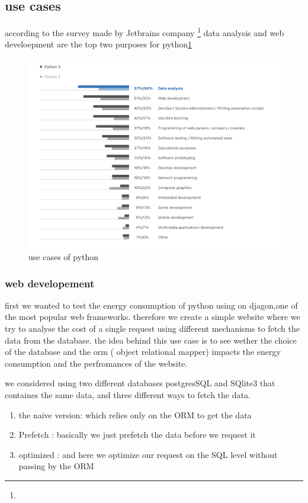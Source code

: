 \subsection{use cases}
according to the survey made by Jetbrains company \footnote
{} data analysis and web develoepment are the top two purposes for python\ref{fig:usecase}

\begin{figure}[hbt]
    \centering
    \includegraphics[width=\linewidth]{imgs/python_use_cases}
    \caption{use cases of python }
    \label{fig:usecase}
\end{figure}


\subsubsection*{web developement}
first we wanted to test the energy consumption of python using on djagon,one of the most popular web frameworks.
therefore we create a simple website where we try to analyse the cost of a single request using different mechanisms to fetch the data from the database.
the idea behind this use case is to see wether the choice of the database and the orm ( object relational mapper) impacts the energy consumption and the perfromances of the website.

we considered using two different databases postgresSQL and SQlite3 that containes the same data, and three different ways to fetch the data.
\begin{enumerate}
    \item the naive version: which relies only on the ORM to get the data
    \item Prefetch : basically we just prefetch the data before we request it
    \item optimized : and here we optimize our request on the SQL level without passing by the ORM
\end{enumerate}

